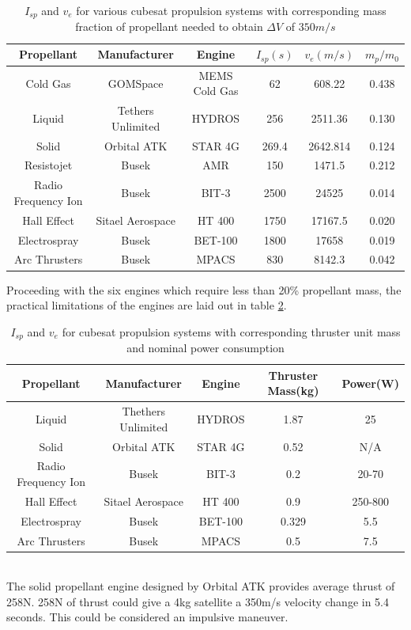 \begin{table}[h!]
	\centering
	\begin{tabular}{c c c c c c }
		\hline
		Propellant & Manufacturer & Engine & $I_{sp}(s)$ & $v_e(m/s)$ & $m_p/m_0$ \\
		\hline
		Cold Gas & GOMSpace & MEMS Cold Gas & 62 & 608.22 & 0.438 \\
		Liquid & Tethers Unlimited & HYDROS & 256 & 2511.36 & 0.130 \\
		Solid & Orbital ATK & STAR 4G & 269.4 & 2642.814 & 0.124 \\
		Resistojet & Busek & AMR & 150 & 1471.5 & 0.212 \\
		Radio Frequency Ion & Busek & BIT-3 & 2500 & 24525 & 0.014 \\
		Hall Effect & Sitael Aerospace & HT 400 & 1750 & 17167.5 & 0.020 \\
		Electrospray & Busek & BET-100 & 1800 & 17658 & 0.019 \\
		Arc Thrusters & Busek & MPACS & 830 & 8142.3 & 0.042 \\
		\hline
	\end{tabular}
	\caption[List of propulsion systems to obtain required $\Delta V$]
	{$I_{sp}$ and $v_e$ for various cubesat propulsion systems with corresponding mass fraction of propellant needed to obtain $\Delta V$ of $350 m/s$}
	\label{MMtab1}
\end{table}

Proceeding with the six engines which require less than 20\% propellant mass, the practical limitations of the engines are laid out in table \ref{MMtab2}.
\\
\begin{table}[h!]
	\centering
	\begin{tabular}{c c c c c }
		\hline
		Propellant & Manufacturer & Engine & Thruster Mass(kg) & Power(W) \\
		\hline
		Liquid & Thethers Unlimited & HYDROS & 1.87 & 25 \\
		Solid & Orbital ATK & STAR 4G & 0.52 & N/A \\
		Radio Frequency Ion & Busek & BIT-3 & 0.2 & 20-70 \\
		Hall Effect & Sitael Aerospace & HT 400 & 0.9 & 250-800 \\
		Electrospray & Busek & BET-100 & 0.329 & 5.5 \\
		Arc Thrusters & Busek & MPACS & 0.5 & 7.5 \\
		\hline
	\end{tabular}
	\caption[List of selected propulsion systems with mass and power consumption]
	{$I_{sp}$ and $v_e$ for cubesat propulsion systems with corresponding thruster unit mass and nominal power consumption}
	\label{MMtab2}
\end{table}
\\
The solid propellant engine designed by Orbital ATK provides average thrust of 258N. 258N of thrust could give a 4kg satellite a 350m/s velocity change in 5.4 seconds. This could be considered an impulsive maneuver.

